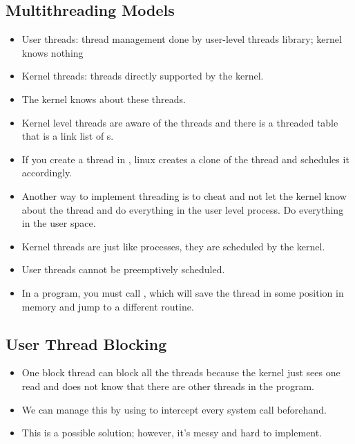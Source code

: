 \documentclass[]{article}
\begin{document}
\subsection{Multithreading Models}
\begin{itemize}
\item User threads: thread management done by user-level threads library; kernel
knows nothing
\item Kernel threads: threads directly supported by the kernel.
\item The kernel knows about these threads.
\item Kernel level threads are aware of the threads and there is a threaded
table that is a link list of s.
\item If you create a thread in , linux creates a clone of
the thread and schedules it accordingly.
\item Another way to implement threading is to cheat and not let the kernel know
about the thread and do everything in the user level process. Do everything in
the user space.
\item Kernel threads are just like processes, they are scheduled by the kernel.
\item User threads cannot be preemptively scheduled.
\item In a program, you must call , which will save the
thread in some position in memory and jump to a different routine.
\end{itemize}

\subsection{User Thread Blocking}
\begin{itemize}
\item One block thread can block all the threads because the kernel just sees
one read and does not know that there are other threads in the program.
\item We can manage this by using  to intercept every system call
beforehand.
\item This is a possible solution; however, it's messy and hard to implement.
\end{itemize}
\end{document}
